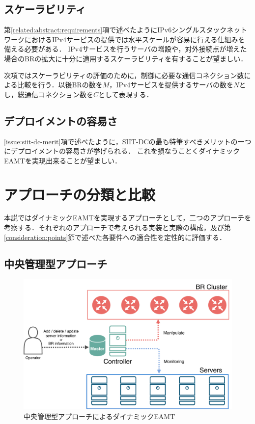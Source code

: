 \subsection{スケーラビリティ}
\label{consideration:points:scalability}

第\ref{related:abstract:requirements}項で述べたようにIPv6シングルスタックネットワークにおけるIPv4サービスの提供では水平スケールが容易に行える仕組みを備える必要がある．
IPv4サービスを行うサーバの増設や，対外接続点が増えた場合のBRの拡大に十分に適用するスケーラビリティを有することが望ましい．

次項ではスケーラビリティの評価のために，制御に必要な通信コネクション数による比較を行う．以後BRの数を$M$，IPv4サービスを提供するサーバの数を$N$とし，総通信コネクション数を$C$として表現する．


\subsection{デプロイメントの容易さ}
\ref{issue:siit-dc-merit}項で述べたように，SIIT-DCの最も特筆すべきメリットの一つにデプロイメントの容易さが挙げられる．
これを損なうことくダイナミックEAMTを実現出来ることが望ましい．


\section{アプローチの分類と比較}
\label{consideration:approach}
本説ではダイナミックEAMTを実現するアプローチとして，二つのアプローチを考察する．それぞれのアプローチで考えられる実装と実際の構成，及び第\ref{consideration:points}節で述べた各要件への適合性を定性的に評価する．



\subsection{中央管理型アプローチ}
\label{consideration:approach:centerized}

\begin{figure}[h]
    \begin{center}
      \includegraphics[width=12cm,pagebox=cropbox,clip]{img/approach_centerized_model.pdf}
    \end{center}
    \caption{中央管理型アプローチによるダイナミックEAMT}
    \label{fig:approach_centerized_model}
\end{figure}

